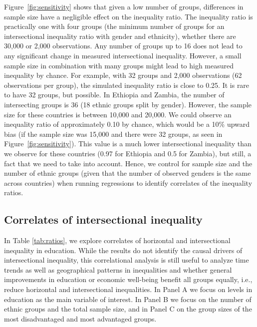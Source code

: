 Figure~\ref{fig:sensitivity} shows that given a low number of groups, differences in sample size have a negligible effect on the inequality ratio. The inequality ratio is practically one with four groups (the minimum number of groups for an intersectional inequality ratio with gender and ethnicity), whether there are 30,000 or 2,000 observations. Any number of groups up to 16 does not lead to any significant change in measured intersectional inequality. However, a small sample size in combination with many groups might lead to high measured inequality by chance. For example, with 32 groups and 2,000 observations (62 observations per group), the simulated inequality ratio is close to 0.25. It is rare to have 32 groups, but possible. In Ethiopia and Zambia, the number of intersecting groups is 36 (18 ethnic groups split by gender). However, the sample size for these countries is between 10,000 and 20,000. We could observe an inequality ratio of approximately 0.10 by chance, which would be a 10\% upward bias (if the sample size was 15,000 and there were 32 groups, as seen in Figure~\ref{fig:sensitivity}). This value is a much lower intersectional inequality than we observe for these countries (0.97 for Ethiopia and 0.5 for Zambia), but still, a fact that we need to take into account. Hence, we control for sample size and the number of ethnic groups (given that the number of observed genders is the same across countries) when running regressions to identify correlates of the inequality ratios.

\hypertarget{correlates-of-intersectional-inequality}{%
\subsection{Correlates of intersectional inequality}\label{correlates-of-intersectional-inequality}}

In Table \ref{tab:ratios}, we explore correlates of horizontal and intersectional inequality in education. While the results do not identify the causal drivers of intersectional inequality, this correlational analysis is still useful to analyze time trends as well as geographical patterns in inequalities and whether general improvements in education or economic well-being benefit all groups equally, i.e., reduce horizontal and intersectional inequalities. In Panel A we focus on levels in education as the main variable of interest. In Panel B we focus on the number of ethnic groups and the total sample size, and in Panel C on the group sizes of the most disadvantaged and most advantaged groups. 

